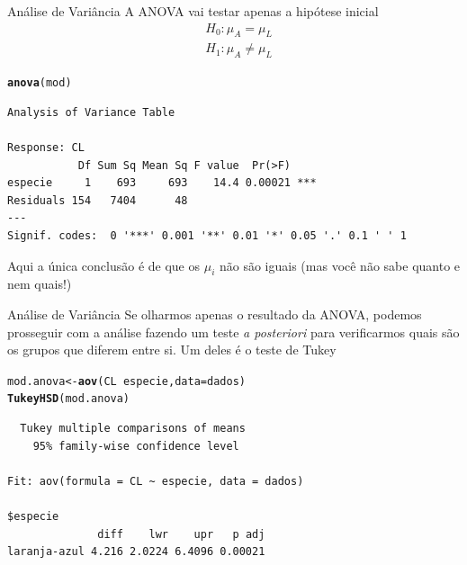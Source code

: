 \documentclass[10pt]{beamer}\usepackage[]{graphicx}\usepackage[]{color}
\makeatletter
\newcommand{\hlopt}[1]{\textcolor[rgb]{0,0,0}{#1}}%
\newcommand{\hlstd}[1]{\textcolor[rgb]{0.345,0.345,0.345}{#1}}%
\newcommand{\hlkwb}[1]{\textcolor[rgb]{0.69,0.353,0.396}{#1}}%
\newcommand{\hlkwc}[1]{\textcolor[rgb]{0.333,0.667,0.333}{#1}}%
\newcommand{\hlkwd}[1]{\textcolor[rgb]{0.737,0.353,0.396}{\textbf{#1}}}%
\newenvironment{kframe}{%
 \def\at@end@of@kframe{}%
 \ifinner\ifhmode%
  \def\at@end@of@kframe{\end{minipage}}%
  \begin{minipage}{\columnwidth}%
 \fi\fi%
 \def\FrameCommand##1{\hskip\@totalleftmargin \hskip-\fboxsep
 \colorbox{shadecolor}{##1}\hskip-\fboxsep
     \hskip-\linewidth \hskip-\@totalleftmargin \hskip\columnwidth}%
 \MakeFramed {\advance\hsize-\width
   \@totalleftmargin\z@ \linewidth\hsize
   \@setminipage}}%
 {\par\unskip\endMakeFramed%
 \at@end@of@kframe}
\newenvironment{knitrout}{}{} %
\theoremstyle{definition}
\makeatother
\begin{document}
\begin{frame}[fragile=singleslide]{Análise de Variância}
A ANOVA vai testar apenas a hipótese inicial
\begin{align*}
  &H_0: \mu_A = \mu_L \\
  &H_1: \mu_A \neq \mu_L
\end{align*}
\begin{knitrout}\small
{}\color{fgcolor}\begin{kframe}
\begin{alltt}
\hlkwd{anova}\hlstd{(mod)}
\end{alltt}
\begin{verbatim}
Analysis of Variance Table

Response: CL
           Df Sum Sq Mean Sq F value  Pr(>F)    
especie     1    693     693    14.4 0.00021 ***
Residuals 154   7404      48                    
---
Signif. codes:  0 '***' 0.001 '**' 0.01 '*' 0.05 '.' 0.1 ' ' 1
\end{verbatim}
\end{kframe}
\end{knitrout}
Aqui a única conclusão é de que os $\mu_i$ não são iguais (mas você
não sabe quanto e nem quais!)
\end{frame}

\begin{frame}[fragile=singleslide]{Análise de Variância}
Se olharmos apenas o resultado da ANOVA, podemos prosseguir com a
análise fazendo um teste \textit{a posteriori} para verificarmos quais
são os grupos que diferem entre si. Um deles é o teste de Tukey
\begin{knitrout}\small
{}\color{fgcolor}\begin{kframe}
\begin{alltt}
\hlstd{mod.anova} \hlkwb{<-} \hlkwd{aov}\hlstd{(CL} \hlopt{~} \hlstd{especie,} \hlkwc{data} \hlstd{= dados)}
\hlkwd{TukeyHSD}\hlstd{(mod.anova)}
\end{alltt}
\begin{verbatim}
  Tukey multiple comparisons of means
    95% family-wise confidence level

Fit: aov(formula = CL ~ especie, data = dados)

$especie
              diff    lwr    upr   p adj
laranja-azul 4.216 2.0224 6.4096 0.00021
\end{verbatim}
\end{kframe}
\end{knitrout}
\end{frame}
\end{document}
